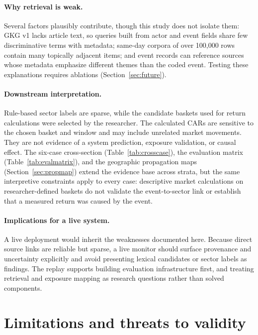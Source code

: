 \documentclass[10pt,a4paper,twocolumn]{article}
\begin{document}
\paragraph{Why retrieval is weak.} Several factors plausibly contribute, though this study does not isolate them: GKG v1 lacks article text, so queries built from actor and event fields share few discriminative terms with metadata; same-day corpora of over 100{,}000 rows contain many topically adjacent items; and event records can reference sources whose metadata emphasize different themes than the coded event. Testing these explanations requires ablations (Section~\ref{sec:future}).

\paragraph{Downstream interpretation.} Rule-based sector labels are sparse, while the candidate baskets used for return calculations were selected by the researcher. The calculated CARs are sensitive to the chosen basket and window and may include unrelated market movements. They are not evidence of a system prediction, exposure validation, or causal effect. The six-case cross-section (Table~\ref{tab:crosscase}), the evaluation matrix (Table~\ref{tab:evalmatrix}), and the geographic propagation maps (Section~\ref{sec:propmap}) extend the evidence base across strata, but the same interpretive constraints apply to every case: descriptive market calculations on researcher-defined baskets do not validate the event-to-sector link or establish that a measured return was caused by the event.

\paragraph{Implications for a live system.} A live deployment would inherit the weaknesses documented here. Because direct source links are reliable but sparse, a live monitor should surface provenance and uncertainty explicitly and avoid presenting lexical candidates or sector labels as findings. The replay supports building evaluation infrastructure first, and treating retrieval and exposure mapping as research questions rather than solved components.

\section{Limitations and threats to validity}\label{sec:limitations}
\end{document}
